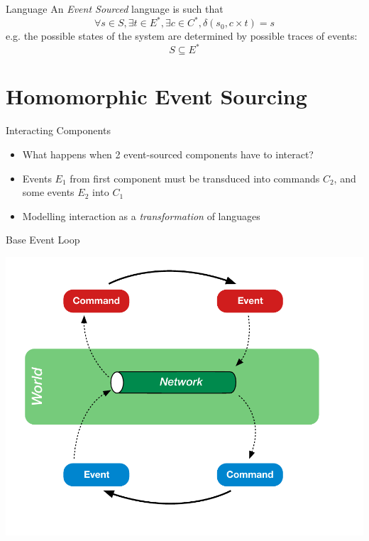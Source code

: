 \begin{frame}[fragile]{Language}
  An \emph{Event Sourced} language is such that
  $$\forall s \in S, \exists t \in E^*, \exists c \in C^*, \delta(s_0,c \times t) = s $$
  e.g. the possible states of the system are determined by possible traces of events:
  $$S \subseteq E^*$$
\end{frame}

\part{Homomorphic Event Sourcing}

\begin{frame}[fragile]{Interacting Components}
  \begin{itemize}
  \item What happens when 2 event-sourced components have to interact?
  \item Events  $E_1$ from first component must be transduced into commands $C_2$, and some events $E_2$ into $C_1$
  \item Modelling interaction as a \emph{transformation} of languages
  \end{itemize}
\end{frame}

\begin{frame}[fragile]{Base Event Loop}
\begin{center}
\includegraphics[height=.8\textheight]{./images/interaction-loop.pdf}
\end{center}
\end{frame}

